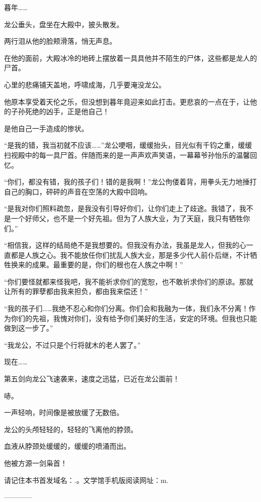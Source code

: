 \begin{this_body}
暮年……

龙公垂头，盘坐在大殿中，披头散发。

两行泪从他的脸颊滑落，悄无声息。

在他的面前，大殿冰冷的地砖上摆放着一具具他并不陌生的尸体，这些都是龙人的尸首。

心里的悲痛铺天盖地，呼啸成海，几乎要淹没龙公。

他原本享受着天伦之乐，但没想到暮年竟迎来如此打击。更悲哀的一点在于，让他的子孙死绝的凶手，正是他自己！

是他自己一手造成的惨状。

“是我的错，我当初就不应该……”龙公哽咽，缓缓抬头，目光似有千钧之重，缓缓扫视殿中的每一具尸首。伴随而来的是一声声欢声笑语，一幕幕爷孙怡乐的温馨回忆。

“你们，都没有错，我的孩子们！错的是我啊！”龙公佝偻着背，用拳头无力地捶打自己的胸口，砰砰的声音在空荡的大殿中回响。

“是我对你们照料疏忽，是我没有引导好你们，让你们走上了歧途。我错了，我不是一个好师父，也不是一个好先祖。但为了人族大业，为了天庭，我只有牺牲你们。”

“相信我，这样的结局绝不是我想要的。但我没有办法，我虽是龙人，但我的心一直都是人族之心。我不能放任你们扰乱人族大业，那是多少代人前仆后继，不计牺牲换来的成果。最重要的是，你们的根也在人族之中啊！”

“你们要怪就都来怪我吧，我不能祈求你们的宽恕，也不敢祈求你们的原谅。那就让所有的罪孽都由我来担负，都由我来偿还！”

“我的孩子们……我绝不忍心和你们分离。你们会和我融为一体，我们永不分离！作为你们的先祖，我愧对你们，没有给予你们美好的生活，安定的环境。但我也只能做到这一步了。”

“我龙公，不过只是个行将就木的老人罢了。”

现在……

第五剑向龙公飞速袭来，速度之迅猛，已近在龙公面前！

哧。

一声轻响，时间像是被放缓了无数倍。

龙公的头颅轻轻的，轻轻的飞离他的脖颈。

血液从脖颈处缓缓的，缓缓的喷涌而出。

他被方源一剑枭首！

请记住本书首发域名：.。文学馆手机版阅读网址：m.

------------

\end{this_body}

